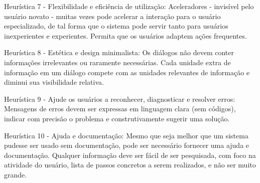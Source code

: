 Heurística 7 - Flexibilidade e eficiência de utilização: Aceleradores - invisível pelo usuário novato - muitas vezes pode acelerar a interação para o usuário especializado, de tal forma que o sistema pode servir tanto para usuários inexperientes e experientes. Permita que os usuários adaptem ações frequentes.  

Heurística 8 -  Estética e design minimalista: Os diálogos não devem conter informações irrelevantes ou raramente necessárias. Cada unidade extra de informação em um diálogo compete com as unidades relevantes de informação e diminui sua visibilidade relativa.     


Heurística 9 - Ajude os usuários a reconhecer, diagnosticar e resolver erros:  Mensagens de erros devem ser expressas em linguagem clara (sem códigos), indicar com precisão o problema e construtivamente sugerir uma solução.

Heurística 10 - Ajuda e documentação: Mesmo que seja melhor que um sistema pudesse ser usado sem documentação, pode ser necessário fornecer uma ajuda e documentação. Qualquer informação deve ser fácil de ser pesquisada, com foco na atividade do usuário, lista de passos concretos a serem realizados, e não ser muito grande.   




